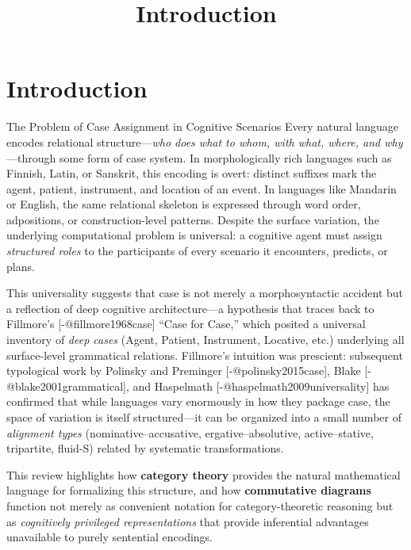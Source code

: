 \documentclass[
  ignorenonframetext,
]{beamer}
\title{\texorpdfstring{Introduction}{Introduction}}
\author{\texorpdfstring{}{}}
\date{}
\begin{document}
\frame{\titlepage}

\section{Introduction}\label{sec:introduction}

\begin{frame}{The Problem of Case Assignment in Cognitive Scenarios}
\protect{}\label{the-problem-of-case-assignment-in-cognitive-scenarios}
Every natural language encodes relational structure---\emph{who does
what to whom, with what, where, and why}---through some form of case
system. In morphologically rich languages such as Finnish, Latin, or
Sanskrit, this encoding is overt: distinct suffixes mark the agent,
patient, instrument, and location of an event. In languages like
Mandarin or English, the same relational skeleton is expressed through
word order, adpositions, or construction-level patterns. Despite the
surface variation, the underlying computational problem is universal: a
cognitive agent must assign \emph{structured roles} to the participants
of every scenario it encounters, predicts, or plans.

This universality suggests that case is not merely a morphosyntactic
accident but a reflection of deep cognitive architecture---a hypothesis
that traces back to Fillmore's {[}-@fillmore1968case{]} ``Case for
Case,'' which posited a universal inventory of \emph{deep cases} (Agent,
Patient, Instrument, Locative, etc.) underlying all surface-level
grammatical relations. Fillmore's intuition was prescient: subsequent
typological work by Polinsky and Preminger {[}-@polinsky2015case{]},
Blake {[}-@blake2001grammatical{]}, and Haspelmath
{[}-@haspelmath2009universality{]} has confirmed that while languages
vary enormously in how they package case, the space of variation is
itself structured---it can be organized into a small number of
\emph{alignment types} (nominative--accusative, ergative--absolutive,
active--stative, tripartite, fluid-S) related by systematic
transformations.

This review highlights how \textbf{category theory} provides the natural
mathematical language for formalizing this structure, and how
\textbf{commutative diagrams} function not merely as convenient notation
for category-theoretic reasoning but as \emph{cognitively privileged
representations} that provide inferential advantages unavailable to
purely sentential encodings.
\end{frame}
\end{document}
